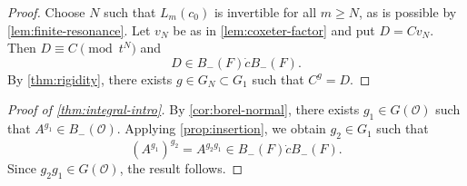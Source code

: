 \documentclass[11pt]{amsart}
\numberwithin{equation}{section}
\theoremstyle{definition}
\theoremstyle{remark}
\begin{document}
\begin{proof}
Choose $N$ such that $L_m(c_0)$ is invertible for all $m\geq N$, as is
possible by \cref{lem:finite-resonance}.  Let $v_N$ be as in
\cref{lem:coxeter-factor} and put $D=Cv_N$.  Then
$D\equiv C\pmod{t^N}$ and
\[
  D\in B_-(F)\dot cB_-(F).
\]
By \cref{thm:rigidity}, there exists $g\in G_N\subset G_1$ such that $C^g=D$.
\end{proof}
\begin{proof}[Proof of \cref{thm:integral-intro}]
By \cref{cor:borel-normal}, there exists $g_1\in G(\mathcal O)$ such that $ A^{g_1}\in B_-(\mathcal O).$
Applying \cref{prop:insertion}, we obtain $g_2\in G_1$ such that
\[
  (A^{g_1})^{g_2}
  =
  A^{g_2g_1}
  \in B_-(F)\dot cB_-(F).
\]
Since $g_2g_1\in G(\mathcal O)$, the result follows.
\end{proof}


\end{document}
